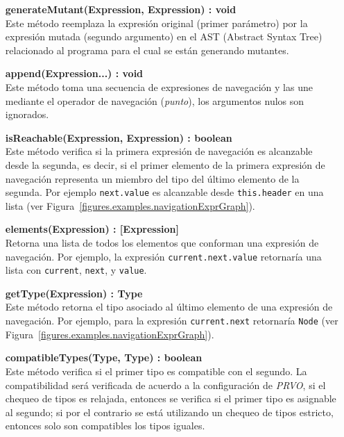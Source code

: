 \begin{enumerate}[leftmargin=.75cm,align=left]
	\item[\textbf{generateMutant(Expression, Expression) : void}]\mbox{}\\ Este m\'etodo reemplaza la expresi\'on original (primer par\'ametro) por la expresi\'on mutada (segundo argumento) en el AST (Abstract Syntax Tree) relacionado al programa para el cual se est\'an generando mutantes.
	
	\item[\textbf{append(Expression...) : void}]\mbox{}\\ Este m\'etodo toma una secuencia de expresiones de navegaci\'on y las une mediante el operador de navegaci\'on (\emph{punto}), los argumentos nulos son ignorados.
	
	\item[\textbf{isReachable(Expression, Expression) : boolean}]\mbox{}\\ Este m\'etodo verifica si la primera expresi\'on de navegaci\'on es alcanzable desde la segunda, es decir, si el primer elemento de la primera expresi\'on de navegaci\'on representa un miembro del tipo del \'ultimo elemento de la segunda. Por ejemplo \lstinline{next.value} es alcanzable desde \lstinline{this.header} en una lista (ver Figura~\ref{figures.examples.navigationExprGraph}).
	
	\item[\textbf{elements(Expression) : [Expression]}]\mbox{}\\ Retorna una lista de todos los elementos que conforman una expresi\'on de navegaci\'on. Por ejemplo, la expresi\'on \lstinline{current.next.value} retornar\'ia una lista con \lstinline{current}, \lstinline{next}, y \lstinline{value}.
	
	\item[\textbf{getType(Expression) : Type}]\mbox{}\\ Este m\'etodo retorna el tipo asociado al \'ultimo elemento de una expresi\'on de navegaci\'on. Por ejemplo, para la expresi\'on \lstinline{current.next} retornar\'ia \lstinline{Node} (ver Figura~\ref{figures.examples.navigationExprGraph}).
	
	\item[\textbf{compatibleTypes(Type, Type) : boolean}]\mbox{}\\ Este m\'etodo verifica si el primer tipo es compatible con el segundo. La compatibilidad ser\'a verificada de acuerdo a la configuraci\'on de \emph{PRVO}, si el chequeo de tipos es relajada, entonces se verifica si el primer tipo es asignable al segundo; si por el contrario se est\'a utilizando un chequeo de tipos estricto, entonces solo son compatibles los tipos iguales.
	

\end{enumerate}
